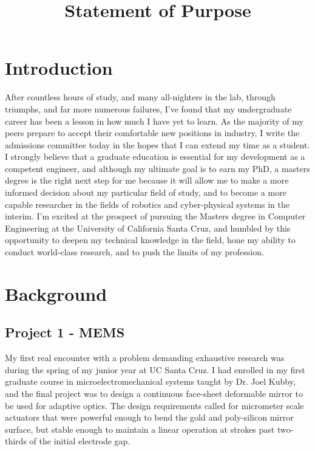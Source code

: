 \documentclass[journal]{IEEEtran}
\begin{document}
%
\title{Statement of Purpose}
\author{
}
\maketitle
\section{Introduction}
After countless hours of study, and many all-nighters in the lab, through triumphs, and far more numerous failures, I've found that my undergraduate career has been a lesson in how much I have yet to learn. As the majority of my peers prepare to accept their comfortable new positions in industry, I write the admissions committee today in the hopes that I can extend my time as a student. I strongly believe that a graduate education is essential for my development as a competent engineer, and although my ultimate goal is to earn my PhD, a masters degree is the right next step for me because it will allow me to make a more informed decision about my particular field of study, and to become a more capable researcher in the fields of robotics and cyber-physical systems in the interim. I'm excited at the prospect of pursuing the Masters degree in Computer Engineering at the University of California Santa Cruz, and humbled by this opportunity to deepen my technical knowledge in the field, hone my ability to conduct world-class research, and to push the limits of my profession. 

\section{Background}
\subsection{Project 1 - MEMS}
My first real encounter with a problem demanding exhaustive research was during the spring of my junior year at UC Santa Cruz. I had enrolled in my first graduate course in microelectromechanical systems taught by Dr. Joel Kubby, and the final project was to design a continuous face-sheet deformable mirror to be used for adaptive optics. The design requirements called for micrometer scale actuators that were powerful enough to bend the gold and poly-silicon mirror surface, but stable enough to maintain a linear operation at strokes past two-thirds of the initial electrode gap. 
\end{document}

